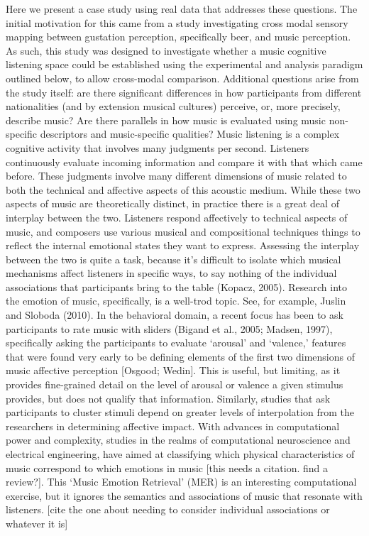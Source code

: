 \documentclass[
  english,
  man,floatsintext]{apa6}
\begin{document}
Here we present a case study using real data that addresses these questions. The initial motivation for this came from a study investigating cross modal sensory mapping between gustation perception, specifically beer, and music perception. As such, this study was designed to investigate whether a music cognitive listening space could be established using the experimental and analysis paradigm outlined below, to allow cross-modal comparison. Additional questions arise from the study itself: are there significant differences in how participants from different nationalities (and by extension musical cultures) perceive, or, more precisely, describe music? Are there parallels in how music is evaluated using music non-specific descriptors and music-specific qualities?
Music listening is a complex cognitive activity that involves many judgments per second. Listeners continuously evaluate incoming information and compare it with that which came before. These judgments involve many different dimensions of music related to both the technical and affective aspects of this acoustic medium. While these two aspects of music are theoretically distinct, in practice there is a great deal of interplay between the two. Listeners respond affectively to technical aspects of music, and composers use various musical and compositional techniques things to reflect the internal emotional states they want to express. Assessing the interplay between the two is quite a task, because it's difficult to isolate which musical mechanisms affect listeners in specific ways, to say nothing of the individual associations that participants bring to the table (Kopacz, 2005).
Research into the emotion of music, specifically, is a well-trod topic. See, for example, Juslin and Sloboda (2010). In the behavioral domain, a recent focus has been to ask participants to rate music with sliders (Bigand et al., 2005; Madsen, 1997), specifically asking the participants to evaluate `arousal' and `valence,' features that were found very early to be defining elements of the first two dimensions of music affective perception {[}Osgood; Wedin{]}. This is useful, but limiting, as it provides fine-grained detail on the level of arousal or valence a given stimulus provides, but does not qualify that information. Similarly, studies that ask participants to cluster stimuli depend on greater levels of interpolation from the researchers in determining affective impact. With advances in computational power and complexity, studies in the realms of computational neuroscience and electrical engineering, have aimed at classifying which physical characteristics of music correspond to which emotions in music {[}this needs a citation. find a review?{]}. This `Music Emotion Retrieval' (MER) is an interesting computational exercise, but it ignores the semantics and associations of music that resonate with listeners. {[}cite the one about needing to consider individual associations or whatever it is{]}\\
\end{document}
